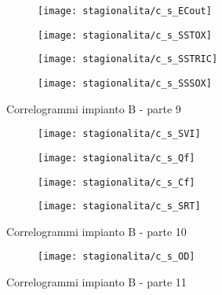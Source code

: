 \begin{sidewaysfigure}[h]\ContinuedFloat
	\renewcommand*\thesubfigure{(\arabic{subfigure})}
	\begin{subfigure}{0.49\textwidth}
		\texttt{[image: stagionalita/c\_s\_ECout]}
		\caption{}
		\centering
	\end{subfigure}
	\begin{subfigure}{0.49\textwidth}
		\texttt{[image: stagionalita/c\_s\_SSTOX]}
		\caption{}
		\centering
	\end{subfigure}

	\begin{subfigure}{0.49\textwidth}
		\texttt{[image: stagionalita/c\_s\_SSTRIC]}
		\caption{}
		\centering
	\end{subfigure}
	\begin{subfigure}{0.49\textwidth}
		\texttt{[image: stagionalita/c\_s\_SSSOX]}	
		\caption{}
		\centering
	\end{subfigure}
	\caption{Correlogrammi impianto B - parte 9}
\end{sidewaysfigure}

\begin{sidewaysfigure}[h]\ContinuedFloat
	\renewcommand*\thesubfigure{(\arabic{subfigure})}
	\begin{subfigure}{0.49\textwidth}
		\texttt{[image: stagionalita/c\_s\_SVI]}
		\caption{}
		\centering
	\end{subfigure}
	\begin{subfigure}{0.49\textwidth}
		\texttt{[image: stagionalita/c\_s\_Qf]}
		\caption{}
		\centering
	\end{subfigure}

	\begin{subfigure}{0.49\textwidth}
		\texttt{[image: stagionalita/c\_s\_Cf]}
		\caption{}
		\centering
	\end{subfigure}
	\begin{subfigure}{0.49\textwidth}
		\texttt{[image: stagionalita/c\_s\_SRT]}
		\caption{}
		\centering
	\end{subfigure}
	\caption{Correlogrammi impianto B - parte 10}
	\label{fig:c_stag4}
\end{sidewaysfigure}

\begin{sidewaysfigure}[h]\ContinuedFloat
\begin{center}
	\renewcommand*\thesubfigure{(\arabic{subfigure})}
	\begin{subfigure}{0.49\textwidth}
		\texttt{[image: stagionalita/c\_s\_OD]}
		\caption{}
		\centering
	\end{subfigure}
\caption{Correlogrammi impianto B - parte 11}
\end{center}
\end{sidewaysfigure}


